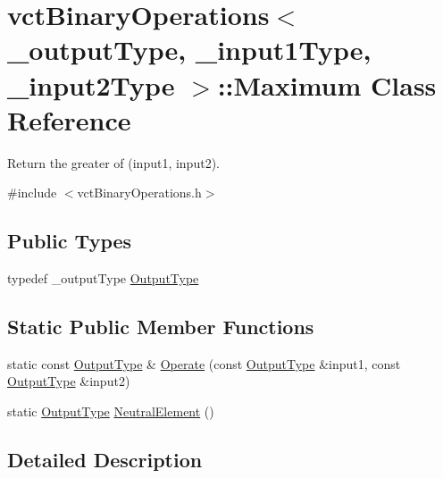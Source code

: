\hypertarget{classvct_binary_operations_1_1_maximum}{\section{vct\-Binary\-Operations$<$ \-\_\-output\-Type, \-\_\-input1\-Type, \-\_\-input2\-Type $>$\-:\-:Maximum Class Reference}
\label{classvct_binary_operations_1_1_maximum}
}


Return the greater of (input1, input2).  




{\ttfamily \#include $<$vct\-Binary\-Operations.\-h$>$}

\subsection*{Public Types}
\begin{DoxyCompactItemize}
\item 
typedef \-\_\-output\-Type \hyperlink{classvct_binary_operations_1_1_maximum_abfe4fd3b0f4c1b3dc210114bff1e92dc}{Output\-Type}
\end{DoxyCompactItemize}
\subsection*{Static Public Member Functions}
\begin{DoxyCompactItemize}
\item 
static const \hyperlink{classvct_binary_operations_1_1_maximum_abfe4fd3b0f4c1b3dc210114bff1e92dc}{Output\-Type} \& \hyperlink{classvct_binary_operations_1_1_maximum_a8cb41e8e5bdea8ce5a56209cfb63a539}{Operate} (const \hyperlink{classvct_binary_operations_1_1_maximum_abfe4fd3b0f4c1b3dc210114bff1e92dc}{Output\-Type} \&input1, const \hyperlink{classvct_binary_operations_1_1_maximum_abfe4fd3b0f4c1b3dc210114bff1e92dc}{Output\-Type} \&input2)
\item 
static \hyperlink{classvct_binary_operations_1_1_maximum_abfe4fd3b0f4c1b3dc210114bff1e92dc}{Output\-Type} \hyperlink{classvct_binary_operations_1_1_maximum_ae66e4aca80b98858f63e15de140eb6b1}{Neutral\-Element} ()
\end{DoxyCompactItemize}


\subsection{Detailed Description}
